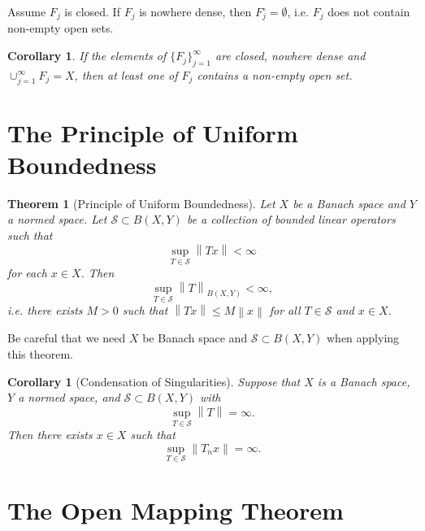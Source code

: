 \documentclass[12pt,a4paper]{report}
\numberwithin{equation}{section}
\theoremstyle{mystyle}
\newtheorem{theorem}[definition]{Theorem}
\newtheorem{corollary}[definition]{Corollary}
\newcommand{\norm}[1]{\left\lVert #1 \right\rVert}
\begin{document}
	Assume $F_j$ is closed. If $F_j$ is nowhere dense, then $F_j^\circ=\emptyset$, i.e. $F_j$ does not contain non-empty open sets. 
	\begin{corollary}
		If the elements of $\{F_j\}_{j=1}^\infty$ are closed, nowhere dense and $\cup_{j=1}^\infty F_j=X$, then at least one of $F_j$ contains a non-empty open set.
	\end{corollary}
	
	
	\section{The Principle of Uniform Boundedness}
	\begin{theorem}[Principle of Uniform Boundedness]\label{thm:uniform bdd}
		Let $X$ be a Banach space and $Y$ a normed space. Let $\mathscr{S}\subset B(X,Y)$ be a collection of bounded linear operators such that 
		$$
		\sup_{T\in \mathscr{S}}\norm{Tx}<\infty
		$$
		for each $x\in X$. Then
		$$
		\sup_{T\in \mathscr{S}}\norm{T}_{B(X,Y)}<\infty,
		$$
		i.e. there exists $M>0$ such that $\norm{Tx}\leq M\norm{x}$ for all $T\in \mathscr{S}$ and $x\in X$.
	\end{theorem}
	Be careful that we need $X$ be Banach space and $\mathscr{S}\subset B(X,Y)$ when applying this theorem.
	
	\begin{corollary}[Condensation of Singularities]
		Suppose that $X$ is a Banach space, $Y$ a normed space, and $\mathscr{S}\subset B(X,Y)$ with
		$$
		\sup_{T\in \mathscr{S}}\norm{T} = \infty.
		$$
		Then there exists $x\in X$ such that
		$$
		\sup_{T\in \mathscr{S}} \norm{T_n x}=\infty.
		$$
	\end{corollary}
	
	\section{The Open Mapping Theorem}
	
\end{document}
